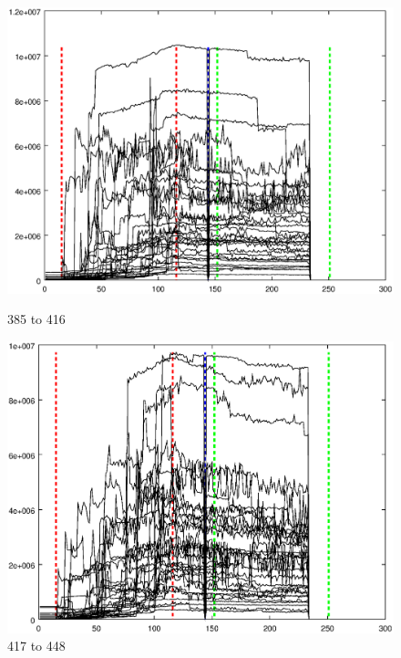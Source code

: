 \documentclass{article}
\begin{document}
\begin{figure}[h]
\centering
\begin{minipage}{.49\textwidth}
	\centering
	\includegraphics[width=0.79\linewidth]{measurement/spad_385-416}
	\caption{385 to 416}
	\label{fig:spad_385-416}
\end{minipage}
\begin{minipage}{.49\textwidth}
	\centering
	\includegraphics[width=0.79\linewidth]{measurement/spad_417-448}
	\caption{417 to 448}
	\label{fig:spad_417-448}
\end{minipage}
\end{figure}
\end{document}
